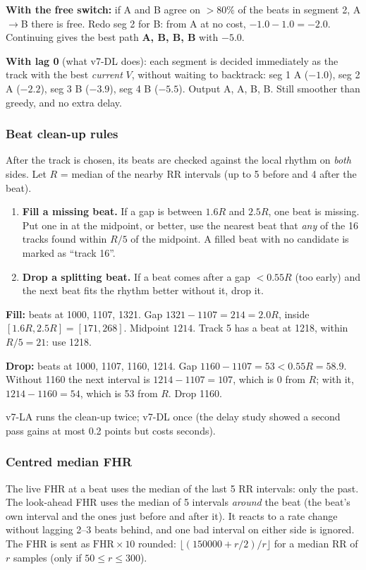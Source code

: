\documentclass[11pt]{article}
\begin{document}
\begin{simple}
\textbf{With the free switch:} if A and B agree on $>80\%$ of the beats in segment 2, A$\to$B there is free. Redo seg 2 for B: from A at no cost, $-1.0-1.0 = -2.0$. Continuing gives the best path \textbf{A, B, B, B} with $-5.0$.\par
\textbf{With lag 0} (what v7-DL does): each segment is decided immediately as the track with the best \emph{current} $V$, without waiting to backtrack: seg 1 A ($-1.0$), seg 2 A ($-2.2$), seg 3 B ($-3.9$), seg 4 B ($-5.5$). Output A, A, B, B. Still smoother than greedy, and no extra delay.
\end{simple}

\subsubsection{Beat clean-up rules}
\label{sec:cleanup}
After the track is chosen, its beats are checked against the local rhythm on \emph{both} sides. Let $R$ = median of the nearby RR intervals (up to 5 before and 4 after the beat).
\begin{enumerate}
  \item \textbf{Fill a missing beat.} If a gap is between $1.6R$ and $2.5R$, one beat is missing. Put one in at the midpoint, or better, use the nearest beat that \emph{any} of the 16 tracks found within $R/5$ of the midpoint. A filled beat with no candidate is marked as ``track 16''.
  \item \textbf{Drop a splitting beat.} If a beat comes after a gap $< 0.55R$ (too early) and the next beat fits the rhythm better without it, drop it.
\end{enumerate}
\begin{simple}[Examples, $R = 107$]
\textbf{Fill:} beats at 1000, 1107, 1321. Gap $1321 - 1107 = 214 = 2.0R$, inside $[1.6R, 2.5R] = [171, 268]$. Midpoint $1214$. Track 5 has a beat at 1218, within $R/5 = 21$: use 1218.\par
\textbf{Drop:} beats at 1000, 1107, 1160, 1214. Gap $1160 - 1107 = 53 < 0.55R = 58.9$. Without 1160 the next interval is $1214 - 1107 = 107$, which is $0$ from $R$; with it, $1214 - 1160 = 54$, which is 53 from $R$. Drop 1160.
\end{simple}
v7-LA runs the clean-up twice; v7-DL once (the delay study showed a second pass gains at most 0.2 points but costs seconds).

\subsubsection{Centred median FHR}
The live FHR at a beat uses the median of the last 5 RR intervals: only the past. The look-ahead FHR uses the median of 5 intervals \emph{around} the beat (the beat's own interval and the ones just before and after it). It reacts to a rate change without lagging 2--3 beats behind, and one bad interval on either side is ignored. The FHR is sent as $\text{FHR}\times 10$ rounded: $\lfloor(150000 + r/2)/r\rfloor$ for a median RR of $r$ samples (only if $50 \le r \le 300$).
\end{document}
